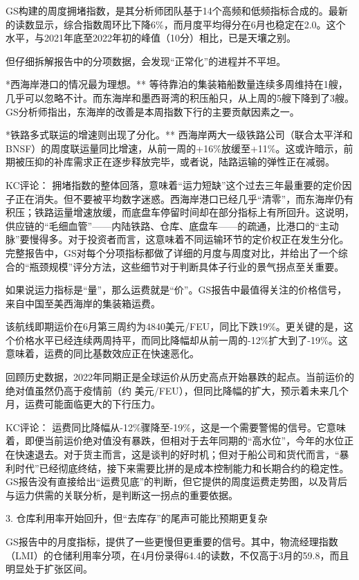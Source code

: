 \documentclass[11pt]{ctexart}
\begin{document}
GS构建的周度拥堵指数，是其分析师团队基于14个高频和低频指标合成的。最新的读数显示，综合指数周环比下降6\%，而月度平均得分在6月也稳定在2.0。这个水平，与2021年底至2022年初的峰值（10分）相比，已是天壤之别。

但仔细拆解报告中的分项数据，会发现“正常化”的进程并不平坦。

*西海岸港口的情况最为理想。** 等待靠泊的集装箱船数量连续多周维持在1艘，几乎可以忽略不计。而东海岸和墨西哥湾的积压船只，从上周的5艘下降到了3艘。GS分析师指出，东海岸的改善是本周指数下行的主要贡献因素之一。

*铁路多式联运的增速则出现了分化。** 西海岸两大一级铁路公司（联合太平洋和BNSF）的周度联运量同比增速，从前一周的+16\%放缓至+11\%。这或许暗示，前期被压抑的补库需求正在逐步释放完毕，或者说，陆路运输的弹性正在减弱。

KC评论： 拥堵指数的整体回落，意味着“运力短缺”这个过去三年最重要的定价因子正在消失。但不要被平均数字迷惑。西海岸港口已经几乎“清零”，而东海岸仍有积压；铁路运量增速放缓，而底盘车停留时间却在部分指标上有所回升。这说明，供应链的“毛细血管”——内陆铁路、仓库、底盘车——的疏通，比港口的“主动脉”要慢得多。对于投资者而言，这意味着不同运输环节的定价权正在发生分化。完整报告中，GS对每个分项指标都做了详细的月度与周度对比，并给出了一个综合的“瓶颈规模”评分方法，这些细节对于判断具体子行业的景气拐点至关重要。

如果说运力指标是“量”，那么运费就是“价”。GS报告中最值得关注的价格信号，来自中国至美西海岸的集装箱运费。

该航线即期运价在6月第三周约为4840美元/FEU，同比下跌19\%。更关键的是，这个价格水平已经连续两周持平，而同比降幅却从前一周的-12\%扩大到了-19\%。这意味着，运费的同比基数效应正在快速恶化。

回顾历史数据，2022年同期正是全球运价从历史高点开始暴跌的起点。当前运价的绝对值虽然仍高于疫情前（约 美元/FEU），但同比降幅的扩大，预示着未来几个月，运费可能面临更大的下行压力。

KC评论： 运费同比降幅从-12\%骤降至-19\%，这是一个需要警惕的信号。它意味着，即便当前运价绝对值没有暴跌，但相对于去年同期的“高水位”，今年的水位正在快速退去。对于货主而言，这是谈判的好时机；但对于船公司和货代而言，“暴利时代”已经彻底终结，接下来需要比拼的是成本控制能力和长期合约的稳定性。 GS报告没有直接给出“运费见底”的判断，但它提供的周度运费走势图，以及背后与运力供需的关联分析，是判断这一拐点的重要依据。

3. 仓库利用率开始回升，但“去库存”的尾声可能比预期更复杂

GS报告中的月度指标，提供了一些更慢但更重要的信号。其中，物流经理指数（LMI）的仓储利用率分项，在4月份录得64.4的读数，不仅高于3月的59.8，而且明显处于扩张区间。
\end{document}
